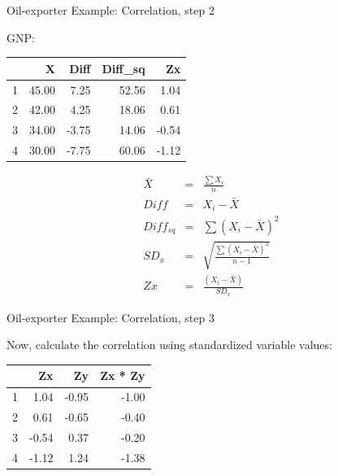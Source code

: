 \documentclass[14pt]{beamer}\usepackage[]{graphicx}\usepackage[]{color}
\begin{document}
\begin{frame}[fragile]{Oil-exporter Example: Correlation, step 2}

\begin{minipage}[ht]{6cm}

{\footnotesize{
GNP:

\begin{table}[ht]
\centering
\begin{tabular}{rrrrr}
  \hline
 & X & Diff & Diff\_sq & Zx \\ 
  \hline
1 & 45.00 & 7.25 & 52.56 & 1.04 \\ 
  2 & 42.00 & 4.25 & 18.06 & 0.61 \\ 
  3 & 34.00 & -3.75 & 14.06 & -0.54 \\ 
  4 & 30.00 & -7.75 & 60.06 & -1.12 \\ 
   \hline
\end{tabular}
\end{table}

}}
\end{minipage}
\begin{minipage}[ht]{5cm}

{\scriptsize{
\begin{eqnarray*}
\bar{X} &=& \frac{ \sum X_i}{n} \\
Diff &=& X_i - \bar{X} \\
Diff_{sq} &=& \sum (X_i - \bar{X})^2 \\
SD_x &=& \sqrt{ \frac{ \sum ( X_i - \bar{X})^2}{n - 1}} \\
Zx &=& \frac{(X_i - \bar{X})}{SD_x}
\end{eqnarray*}
}}
\end{minipage}

\end{frame}

\begin{frame}[fragile]{Oil-exporter Example: Correlation, step 3}

Now, calculate the correlation using standardized variable values:


\begin{table}[ht]
\centering
\begin{tabular}{rrrr}
  \hline
 & Zx & Zy & Zx * Zy \\ 
  \hline
1 & 1.04 & -0.95 & -1.00 \\ 
  2 & 0.61 & -0.65 & -0.40 \\ 
  3 & -0.54 & 0.37 & -0.20 \\ 
  4 & -1.12 & 1.24 & -1.38 \\ 
   \hline
\end{tabular}
\end{table}


\end{frame}
\end{document}
